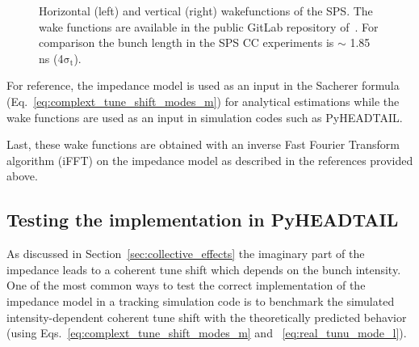 \begin{figure}[!ht]
\begin{subfigure}[t]{0.45\textwidth}
    \end{subfigure}
    \hfill
     \caption{Horizontal (left) and vertical (right) wakefunctions of the SPS. The wake functions are available in the public GitLab repository of~\cite{sps_impedance_model_git}. For comparison the bunch length in the SPS CC experiments is $\sim$ 1.85\,ns (4$\mathrm{\sigma_t}$).} %
     \label{fig:sps_wakefunctions_model_H_V}
 \end{figure}


For reference, the impedance model is used as an input in the Sacherer formula (Eq.~\eqref{eq:complext_tune_shift_modes_m}) for analytical estimations while the wake functions are used as an input in simulation codes such as PyHEADTAIL.

Last, these wake functions are obtained with an inverse Fast Fourier Transform algorithm (iFFT) on the impedance model as described in the references provided above.



\subsection{Testing the implementation in PyHEADTAIL}\label{subsec:test_implementation_pyheatail}
As discussed in Section~\ref{sec:collective_effects} the imaginary part of the impedance leads to a coherent tune shift which depends on the bunch intensity. One of the most common ways to test the correct implementation of the impedance model in a tracking simulation code is to benchmark the simulated intensity-dependent coherent tune shift with the theoretically predicted behavior (using Eqs.~\eqref{eq:complext_tune_shift_modes_m} and ~\eqref{eq:real_tunu_mode_l}).

